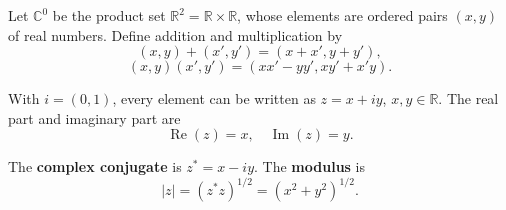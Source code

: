 Let $\mathbb{C}^0$ be the product set $\mathbb{R}^2 = \mathbb{R} \times \mathbb{R}$, whose elements are ordered pairs $(x, y)$ of real numbers. Define addition and multiplication by
$$(x, y) + (x', y') = (x + x', y + y'),$$
$$(x, y)(x', y') = (xx' - yy', xy' + x'y).$$

With $i = (0, 1)$, every element can be written as $z = x + iy$, $x, y \in \mathbb{R}$. The real part and imaginary part are
$$\operatorname{Re}(z) = x, \quad \operatorname{Im}(z) = y.$$

The \textbf{complex conjugate} is $z^* = x - iy$. The \textbf{modulus} is
$$|z| = (z^*z)^{1/2} = (x^2 + y^2)^{1/2}.$$

